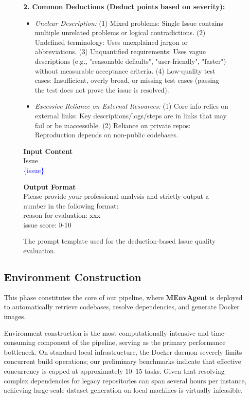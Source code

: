 \documentclass{article}
\theoremstyle{plain}
\theoremstyle{definition}
\theoremstyle{remark}
\begin{document}
\begin{figure}[t]
\begin{tcolorbox}[
    colback=white,
    colframe=gray!60,
    title=\textbf{Prompt for Issue Quality Evaluation},
    coltitle=white,
    boxrule=0.8pt,
    arc=2pt,
    width=\linewidth
]
\textbf{2. Common Deductions (Deduct points based on severity):}
\begin{itemize}[leftmargin=15pt, topsep=2pt, itemsep=0pt, parsep=0pt]
    \item \textit{Unclear Description:}
    (1) Mixed problems: Single Issue contains multiple unrelated problems or logical contradictions.
    (2) Undefined terminology: Uses unexplained jargon or abbreviations.
    (3) Unquantified requirements: Uses vague descriptions (e.g., "reasonable defaults", "user-friendly", "faster") without measurable acceptance criteria.
    (4) Low-quality test cases: Insufficient, overly broad, or missing test cases (passing the test does not prove the issue is resolved).
    \item \textit{Excessive Reliance on External Resources:}
    (1) Core info relies on external links: Key descriptions/logs/steps are in links that may fail or be inaccessible.
    (2) Reliance on private repos: Reproduction depends on non-public codebases.
\end{itemize}

\vspace{0.5em}
\textbf{Input Content} \\
Issue \\
\textcolor{blue}{\{issue\}}

\vspace{0.5em}
\textbf{Output Format} \\
Please provide your professional analysis and strictly output a number in the following format: \\
reason for evaluation: xxx \\
issue score: 0-10

\end{tcolorbox}
\caption{The prompt template used for the deduction-based Issue quality evaluation.}\label{fig:quality_prompt}
\end{figure}

\subsection{Environment Construction}
This phase constitutes the core of our pipeline, where \textbf{MEnvAgent} is deployed to automatically retrieve codebases, resolve dependencies, and generate Docker images. 

Environment construction is the most computationally intensive and time-consuming component of the pipeline, serving as the primary performance bottleneck. 
On standard local infrastructure, the Docker daemon severely limits concurrent build operations; our preliminary benchmarks indicate that effective concurrency is capped at approximately 10--15 tasks. Given that resolving complex dependencies for legacy repositories can span several hours per instance, achieving large-scale dataset generation on local machines is virtually infeasible.
\end{document}
